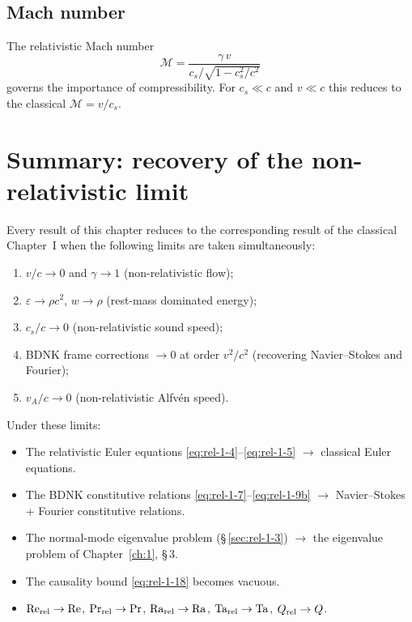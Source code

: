 \subsection{Mach number}
The relativistic Mach number
\begin{equation}
\label{eq:rel-1-29}
\mathcal{M} = \frac{\gamma\,v}{c_{s}/\sqrt{1-c_{s}^{2}/c^{2}}}
\end{equation}
governs the importance of compressibility.  For $c_{s}\ll c$ and
$v\ll c$ this reduces to the classical $\mathcal{M}=v/c_{s}$.

\section{Summary: recovery of the non-relativistic limit}
\label{sec:rel-1-5}

Every result of this chapter reduces to the corresponding result of
the classical Chapter~I when the following limits are taken
simultaneously:
\begin{enumerate}
\item $v/c\to 0$ and $\gamma\to 1$ (non-relativistic flow);
\item $\varepsilon\to\rho c^{2}$, $w\to\rho$ (rest-mass dominated
  energy);
\item $c_{s}/c\to 0$ (non-relativistic sound speed);
\item BDNK frame corrections $\to 0$ at order $v^{2}/c^{2}$
  (recovering Navier--Stokes and Fourier);
\item $v_{A}/c\to 0$ (non-relativistic Alfv\'en speed).
\end{enumerate}

Under these limits:
\begin{itemize}
\item The relativistic Euler equations
  \eqref{eq:rel-1-4}--\eqref{eq:rel-1-5} $\to$ classical Euler
  equations.
\item The BDNK constitutive relations
  \eqref{eq:rel-1-7}--\eqref{eq:rel-1-9b} $\to$ Navier--Stokes +
  Fourier constitutive relations.
\item The normal-mode eigenvalue problem (\S\,\ref{sec:rel-1-3}) $\to$
  the eigenvalue problem of Chapter~\ref{ch:1}, \S\,3.
\item The causality bound \eqref{eq:rel-1-18} becomes vacuous.
\item $\mathrm{Re}_{\rm rel}\to\mathrm{Re}$,
  $\mathrm{Pr}_{\rm rel}\to\mathrm{Pr}$,
  $\mathrm{Ra}_{\rm rel}\to\mathrm{Ra}$,
  $\mathrm{Ta}_{\rm rel}\to\mathrm{Ta}$,
  $Q_{\rm rel}\to Q$.
\end{itemize}

